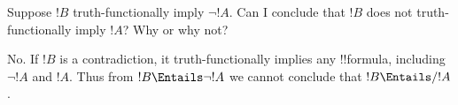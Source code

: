 \documentclass[../../../include/open-logic-section]{subfiles}
\begin{document}


\begin{prob}
\citep[1.1 item 6]{MacFarlane-2020-PhilosophicalLogicContemporary}

Suppose $!B$ truth-functionally imply $\lnot!A$. Can I conclude that
$!B$ does not truth-functionally imply $!A$? Why or why not?

\begin{ans}
No. If $!B$ is a contradiction, it truth-functionally implies any 
!!{formula}, including $\lnot!A$ and $!A$. Thus from $!B\Entails\lnot!A$
we cannot conclude that $!B\Entails/!A$.
\end{ans}

\end{prob}
\end{document}
